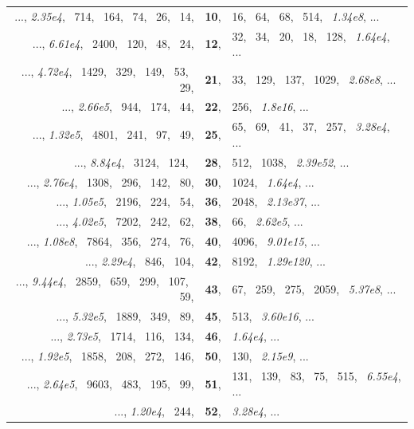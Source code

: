 \documentclass[12pt,reqno]{article}
\begin{document}
\begin{center} \begin{tabular}{rcl}
  \hline
  ..., \textit{2.35e4}, \, 714, \, 164, \, 74, \, 26, \, 14, & \textbf{10}, & 16, \, 64, \, 68, \, 514, \, \textit{1.34e8}, ... \\
  ..., \textit{6.61e4}, \, 2400, \, 120, \, 48, \, 24, & \textbf{12}, & 32, \, 34, \, 20, \, 18, \, 128, \, \textit{1.64e4}, ... \\
  ..., \textit{4.72e4}, \, 1429, \, 329, \, 149, \, 53, \, 29, & \textbf{21}, & 33, \, 129, \, 137, \, 1029, \, \textit{2.68e8}, ... \\
  ..., \textit{2.66e5}, \, 944, \, 174, \, 44, & \textbf{22}, & 256, \, \textit{1.8e16}, ... \\
  ..., \textit{1.32e5}, \, 4801, \, 241, \, 97, \, 49, & \textbf{25}, & 65, \, 69, \, 41, \, 37, \, 257, \, \textit{3.28e4}, ... \\
  ..., \textit{8.84e4}, \, 3124, \, 124, \, & \textbf{28}, & 512, \, 1038, \, \textit{2.39e52}, ... \\
  ..., \textit{2.76e4}, \, 1308, \, 296, \, 142, \, 80, & \textbf{30}, & 1024, \, \textit{1.64e4}, ... \\
  ..., \textit{1.05e5}, \, 2196, \, 224, \, 54, & \textbf{36}, & 2048, \, \textit{2.13e37}, ... \\
  ..., \textit{4.02e5}, \, 7202, \, 242, \, 62, & \textbf{38}, & 66, \, \textit{2.62e5}, ... \\
  ..., \textit{1.08e8}, \, 7864, \, 356, \, 274, \, 76, & \textbf{40}, & 4096, \, \textit{9.01e15}, ... \\
  ..., \textit{2.29e4}, \, 846, \, 104, & \textbf{42}, & 8192, \, \textit{1.29e120}, ... \\
  ..., \textit{9.44e4}, \, 2859, \, 659, \, 299, \, 107, \, 59, & \textbf{43}, & 67, \, 259, \, 275, \, 2059, \, \textit{5.37e8}, ... \\
  ..., \textit{5.32e5}, \, 1889, \, 349, \, 89, & \textbf{45}, & 513, \, \textit{3.60e16}, ... \\
  ..., \textit{2.73e5}, \, 1714, \, 116, \, 134, & \textbf{46}, & \textit{1.64e4}, ... \\
  ..., \textit{1.92e5}, \, 1858, \, 208, \, 272, \, 146, & \textbf{50}, & 130, \, \textit{2.15e9}, ... \\
  ..., \textit{2.64e5}, \, 9603, \, 483, \, 195, \, 99, & \textbf{51}, & 131, \, 139, \, 83, \, 75, \, 515, \, \textit{6.55e4}, ... \\
  ..., \textit{1.20e4}, \, 244, & \textbf{52}, & \textit{3.28e4}, ... \\

\end{tabular}
\end{center}
\end{document}
